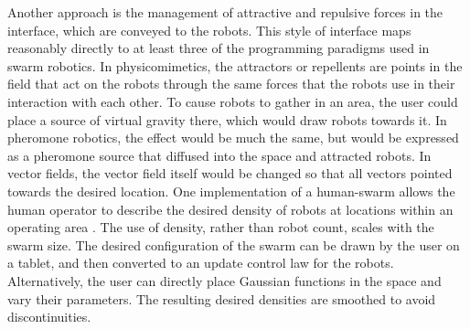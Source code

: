 Another approach is the management of attractive and repulsive forces in the interface, which are conveyed to the robots. 
This style of interface maps reasonably directly to at least three of the programming paradigms used in swarm robotics. 
In physicomimetics, the attractors or repellents are points in the field that act on the robots through the same forces that the robots use in their interaction with each other. 
To cause robots to gather in an area, the user could place a source of virtual gravity there, which would draw robots towards it. 
In pheromone robotics, the effect would be much the same, but would be expressed as a pheromone source that diffused into the space and attracted robots. 
In vector fields, the vector field itself would be changed so that all vectors pointed towards the desired location. 
One implementation of a human-swarm allows the human operator to describe the desired density of robots at locations within an operating area \citep{diaz2017human}. 
The use of density, rather than robot count, scales with the swarm size.
The desired configuration of the swarm can be drawn by the user on a tablet, and then converted to an update control law for the robots.
Alternatively, the user can directly place Gaussian functions in the space and vary their parameters. 
The resulting desired densities are smoothed to avoid discontinuities.

